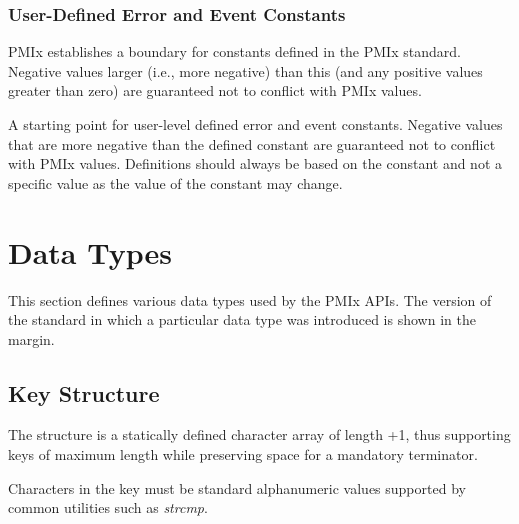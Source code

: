 \subsubsection{User-Defined Error and Event Constants}
\label{api:struct:usererrors}

\ac{PMIx} establishes a boundary for constants defined in the \ac{PMIx} standard. Negative values larger (i.e., more negative) than this (and any positive values greater than zero) are guaranteed not to conflict with \ac{PMIx} values.

\begin{constantdesc}
%
A starting point for user-level defined error and event constants.
Negative values that are more negative than the defined constant are guaranteed not to conflict with \ac{PMIx} values.
Definitions should always be based on the  constant and not a specific value as the value of the constant may change.
%
\end{constantdesc}



\section{Data Types}

This section defines various data types used by the \ac{PMIx} APIs. The version of the standard in which a particular data type was introduced is shown in the margin.

\subsection{Key Structure}

The  structure is a statically defined character array of length +1, thus supporting keys of maximum length  while preserving space for a mandatory  terminator.


Characters in the key must be standard alphanumeric values supported by common utilities such as \textit{strcmp}.

